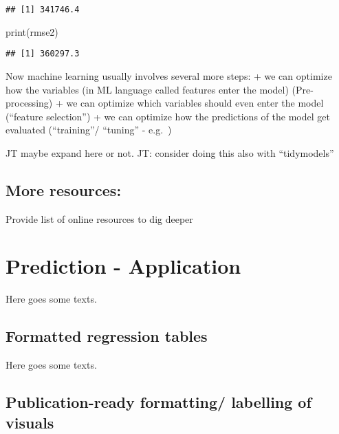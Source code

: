 \documentclass[
]{book}
\newenvironment{Shaded}{\begin{snugshade}}{\end{snugshade}}
\newcommand{\FunctionTok}[1]{\textcolor[rgb]{0.00,0.00,0.00}{#1}}
\newcommand{\FunctionTok}[1]{\textcolor[rgb]{0.13,0.29,0.53}{\textbf{#1}}}
\newcommand{\NormalTok}[1]{#1}
\begin{document}
\begin{verbatim}
## [1] 341746.4
\end{verbatim}

\begin{Shaded}
\begin{Highlighting}[]
\FunctionTok{print}\NormalTok{(rmse2)}
\end{Highlighting}
\end{Shaded}

\begin{verbatim}
## [1] 360297.3
\end{verbatim}

Now machine learning usually involves several more steps:
+ we can optimize how the variables (in ML language called features enter the model) (Pre-processing)
+ we can optimize which variables should even enter the model (``feature selection'')
+ we can optimize how the predictions of the model get evaluated (``training''/ ``tuning'' - e.g.~)

JT maybe expand here or not.
JT: consider doing this also with ``tidymodels''

\hypertarget{more-resources}{%
\section{More resources:}\label{more-resources}}

Provide list of online resources to dig deeper

\hypertarget{pm-a}{%
\chapter{Prediction - Application}\label{pm-a}}

Here goes some texts.

\hypertarget{formatted-regression-tables}{%
\section{Formatted regression tables}\label{formatted-regression-tables}}

Here goes some texts.

\hypertarget{publication-ready-formatting-labelling-of-visuals}{%
\section{Publication-ready formatting/ labelling of visuals}\label{publication-ready-formatting-labelling-of-visuals}}
\end{document}
